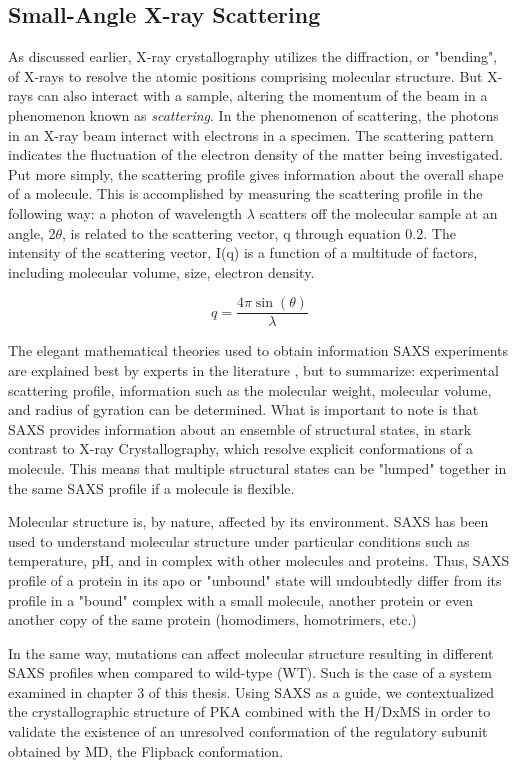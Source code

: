 \documentclass[12pt]{ucsddissertation}
\begin{document}
\begin{dissertationintroduction}
\subsection{Small-Angle X-ray Scattering}
As discussed earlier, X-ray crystallography utilizes the diffraction, or "bending", of X-rays to resolve the atomic positions comprising molecular structure. But X-rays can also interact with a sample, altering the momentum of the beam in a phenomenon known as \textit{scattering}. In the phenomenon of scattering, the photons in an X-ray beam interact with electrons in a specimen. The scattering pattern indicates the fluctuation of the electron density of the matter being investigated. Put more simply, the scattering profile gives information about the overall shape of a molecule. This is accomplished by measuring the scattering profile in the following way: a photon of wavelength $\lambda$ scatters off the molecular sample at an angle, 2$\theta$, is related to the scattering vector, q through equation 0.2. The intensity of the scattering vector, I(q) is a function of a multitude of factors, including molecular volume, size, electron density. 

\begin{equation}
    q = \frac { 4 \pi \sin ( \theta ) } { \lambda }
\end{equation}

The elegant mathematical theories used to obtain information SAXS experiments are explained best by experts in the literature \cite{Boldon2015}, but to summarize: experimental scattering profile, information such as the molecular weight, molecular volume, and radius of gyration can be determined. What is important to note is that SAXS provides information about an ensemble of structural states, in stark contrast to X-ray Crystallography, which resolve explicit conformations of a molecule. This means that multiple structural states can be "lumped" together in the same SAXS profile if a molecule is flexible. 

 Molecular structure is, by nature, affected by its environment. SAXS has been used to understand molecular structure under particular conditions such as temperature, pH\cite{Carvalho2012}, and in complex with other molecules and proteins\cite{Cheng2009}. Thus, SAXS profile of a protein in its apo or "unbound" state will undoubtedly differ from its profile in a "bound" complex with a small molecule, another protein or even another copy of the same protein (homodimers, homotrimers, etc.)
 
 In the same way, mutations can affect molecular structure resulting in different SAXS profiles when compared to wild-type (WT). Such is the case of a system examined in chapter 3 of this thesis. Using SAXS as a guide, we contextualized the crystallographic structure of PKA combined with the H/DxMS in order to validate the existence of an unresolved conformation of the regulatory subunit obtained by MD, the Flipback conformation.
 

\end{dissertationintroduction}
\end{document}

